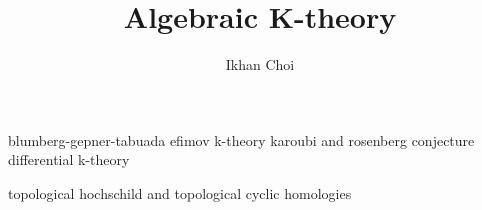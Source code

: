 \documentclass{../../large}
\begin{document}
\title{Algebraic K-theory}
\author{Ikhan Choi}
\maketitle
\tableofcontents

\part{}
\chapter{}



blumberg-gepner-tabuada
efimov k-theory
karoubi and rosenberg conjecture
differential k-theory


topological hochschild and topological cyclic homologies
\end{document}
